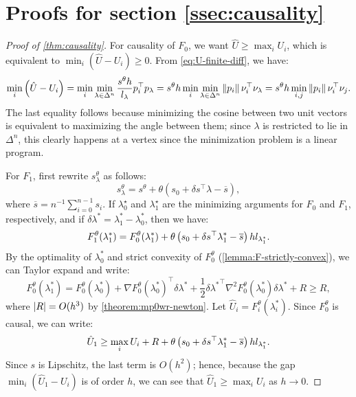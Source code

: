 \documentclass[sisc-eikonal.tex]{subfiles}
\begin{document}
\section{Proofs for section \ref{ssec:causality}}

\begin{proof}[Proof of \cref{thm:causality}]
  For causality of $F_0$, we want $\hat{U} \geq \max_i U_i$, which is
  equivalent to $\min_i(\hat{U} - U_i) \geq 0$. From
  \cref{eq:U-finite-diff}, we have:
  \begin{equation}
    \min_i \left(\hat{U} - U_i\right) = \min_i \min_{\lambda \in \Delta^n} \frac{s^\theta h}{l_\lambda} p_i^\top p_\lambda = s^\theta h \min_i \min_{\lambda \in \Delta^n} \left\|p_i\right\| \nu_i^\top \nu_{\lambda} = s^\theta h \min_{i, j} \left\|p_i\right\| \nu_i^\top \nu_j.
  \end{equation}
  The last equality follows because minimizing the cosine between two
  unit vectors is equivalent to maximizing the angle between them;
  since $\lambda$ is restricted to lie in $\Delta^n$, this clearly
  happens at a vertex since the minimization problem is a linear
  program.

  For $F_1$, first rewrite $s_\lambda^\theta$ as follows:
  \begin{equation}
    s_\lambda^\theta = s^\theta + \theta (s_0 + \delta s^\top \lambda - \overline{s}),
  \end{equation}
  where $\overline{s} = n^{-1} \sum_{i=0}^{n-1} s_i$. If
  $\lambda_0^\star$ and $\lambda_1^\star$ are the minimizing arguments
  for $F_0$ and $F_1$, respectively, and if
  $\delta \lambda^* = \lambda_1^* - \lambda_0^*$, then we have:
  \begin{equation}
    F_1^\theta(\lambda_1^*) = F_0^\theta(\lambda_1^*) + \theta \left(s_0 + \delta s^\top \lambda_1^* - \overline{s}\right) h l_{\lambda_1^\star}.
  \end{equation}
  By the optimality of $\lambda_0^*$ and strict convexity of
  $F_0^\theta$ (\cref{lemma:F-strictly-convex}), we can Taylor expand
  and write:
  \begin{equation}
    F_0^\theta(\lambda_1^*) = F_0^\theta(\lambda_0^*) + \nabla F_0^\theta(\lambda_0^*)^\top \delta \lambda^* + \frac{1}{2} {\delta \lambda^*}^\top \nabla^2 F_0^\theta(\lambda_0^*) \delta \lambda^* + R \geq R,
  \end{equation}
  where $\left|R\right| = O(h^3)$ by \cref{theorem:mp0wr-newton}. Let
  $\hat{U}_i = F_i^\theta(\lambda_i^*)$. Since $F_0^\theta$ is causal,
  we can write:
  \begin{equation}
    \hat{U}_1 \geq \max_i U_i + R + \theta \left(s_0 + \delta s^\top \lambda_1^* - \overline{s}\right) h l_{\lambda_1^*}.
  \end{equation}
  Since $s$ is Lipschitz, the last term is $O(h^2)$; hence, because
  the gap $\min_i(\hat{U}_1 - U_i)$ is of order $h$, we can see that
  $\hat{U}_1 \geq \max_i U_i$ as $h \to 0$.
\end{proof}
\end{document}
